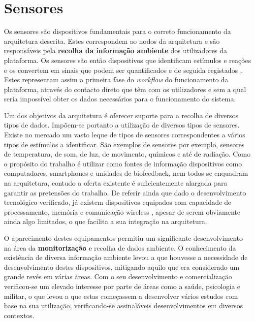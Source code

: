 \section{Sensores}

Os sensores são dispositivos fundamentais para o correto funcionamento da arquitetura descrita. Estes correspondem ao nodos da arquitetura e são responsáveis pela \textbf{recolha da informação ambiente} dos utilizadores da plataforma. Os sensores são então dispositivos que identificam estímulos e reações e os convertem em sinais que podem ser quantificados e de seguida registados \cite{akyildiz2002wireless}. Estes representam assim a primeira fase do \textit{workflow} do funcionamento da plataforma, através do contacto direto que têm com os utilizadores e sem a qual seria impossível obter os dados necessários para o funcionamento do sistema.

Um dos objetivos da arquitetura é oferecer suporte para a recolha de diversos tipos de dados. Impõem-se portanto a utilização de diversos tipos de sensores. Existe no mercado um vasto leque de tipos de sensores correspondentes a vários tipos de estímulos a identificar. São exemplos de sensores por exemplo, sensores de temperatura, de som, de luz, de movimento, químicos e até de radiação. Como o propósito do trabalho é utilizar como fontes de informação dispositivos como computadores, smartphones e unidades de biofeedback, nem todos se enquadram na arquitetura, contudo a oferta existente é suficientemente alargada para garantir as pretensões do trabalho. De referir ainda que dado o desenvolvimento tecnológico verificado, já existem dispositivos equipados com capacidade de processamento, memória e comunicação wireless \cite{akyildiz2002wireless}, apesar de serem obviamente ainda algo limitados, o que facilita a sua integração na arquitetura.

O aparecimento destes equipamentos permitiu um significante desenvolvimento na área da \textbf{monitorização} e recolha de dados ambiente\cite{himakashi2012wireless}. O conhecimento da existência de diversa informação ambiente levou a que houvesse a necessidade de desenvolvimento destes dispositivos, mitigando aquilo que era considerado um grande revés em várias áreas. Com o seu desenvolvimento e comercialização verificou-se um elevado interesse por parte de áreas como a saúde, psicologia e militar, o que levou a que estas começassem a desenvolver vários estudos com base na sua utilização, verificando-se assinaláveis desenvolvimentos em diversos contextos\cite{himakashi2012wireless}.


